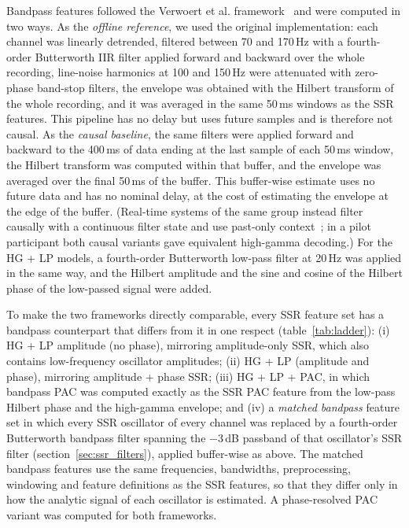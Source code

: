 \documentclass{iopjournal}
\begin{document}
Bandpass features followed the Verwoert et al. framework~\cite{dataset} and were computed in two ways. As the \emph{offline reference}, we used the original implementation: each channel was linearly detrended, filtered between 70 and 170\,Hz with a fourth-order Butterworth IIR filter applied forward and backward over the whole recording, line-noise harmonics at 100 and 150\,Hz were attenuated with zero-phase band-stop filters, the envelope was obtained with the Hilbert transform of the whole recording, and it was averaged in the same 50\,ms windows as the SSR features. This pipeline has no delay but uses future samples and is therefore not causal. As the \emph{causal baseline}, the same filters were applied forward and backward to the 400\,ms of data ending at the last sample of each 50\,ms window, the Hilbert transform was computed within that buffer, and the envelope was averaged over the final 50\,ms of the buffer. This buffer-wise estimate uses no future data and has no nominal delay, at the cost of estimating the envelope at the edge of the buffer. (Real-time systems of the same group instead filter causally with a continuous filter state and use past-only context~\cite{Angrick2021}; in a pilot participant both causal variants gave equivalent high-gamma decoding.) For the HG + LP models, a fourth-order Butterworth low-pass filter at 20\,Hz was applied in the same way, and the Hilbert amplitude and the sine and cosine of the Hilbert phase of the low-passed signal were added.

To make the two frameworks directly comparable, every SSR feature set has a bandpass counterpart that differs from it in one respect (table~\ref{tab:ladder}): (i) HG + LP amplitude (no phase), mirroring amplitude-only SSR, which also contains low-frequency oscillator amplitudes; (ii) HG + LP (amplitude and phase), mirroring amplitude + phase SSR; (iii) HG + LP + PAC, in which bandpass PAC was computed exactly as the SSR PAC feature from the low-pass Hilbert phase and the high-gamma envelope; and (iv) a \emph{matched bandpass} feature set in which every SSR oscillator of every channel was replaced by a fourth-order Butterworth bandpass filter spanning the $-3$\,dB passband of that oscillator's SSR filter (section~\ref{sec:ssr_filters}), applied buffer-wise as above. The matched bandpass features use the same frequencies, bandwidths, preprocessing, windowing and feature definitions as the SSR features, so that they differ only in how the analytic signal of each oscillator is estimated. A phase-resolved PAC variant was computed for both frameworks.
\end{document}
